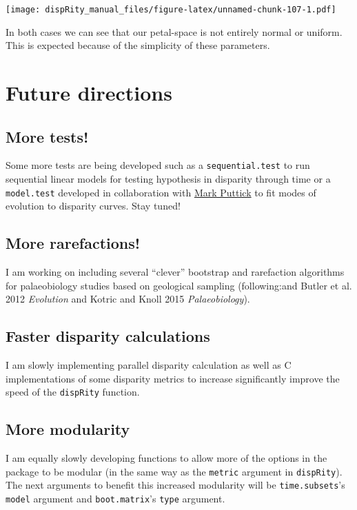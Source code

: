 \documentclass[]{book}
\theoremstyle{definition}
\theoremstyle{definition}
\theoremstyle{remark}
\begin{document}
\texttt{[image: dispRity\_manual\_files/figure-latex/unnamed-chunk-107-1.pdf]}

In both cases we can see that our petal-space is not entirely normal or
uniform. This is expected because of the simplicity of these parameters.

\chapter{Future directions}\label{future-directions}

\section{More tests!}\label{more-tests}

Some more tests are being developed such as a \texttt{sequential.test}
to run sequential linear models for testing hypothesis in disparity
through time or a \texttt{model.test} developed in collaboration with
\href{https://puttickbiology.wordpress.com/}{Mark Puttick} to fit modes
of evolution to disparity curves. Stay tuned!

\section{More rarefactions!}\label{more-rarefactions}

I am working on including several ``clever'' bootstrap and rarefaction
algorithms for palaeobiology studies based on geological sampling
(following:and Butler et al. 2012 \emph{Evolution} and Kotric and Knoll
2015 \emph{Palaeobiology}).

\section{Faster disparity
calculations}\label{faster-disparity-calculations}

I am slowly implementing parallel disparity calculation as well as C
implementations of some disparity metrics to increase significantly
improve the speed of the \texttt{dispRity} function.

\section{More modularity}\label{more-modularity}

I am equally slowly developing functions to allow more of the options in
the package to be modular (in the same way as the \texttt{metric}
argument in \texttt{dispRity}). The next arguments to benefit this
increased modularity will be \texttt{time.subsets}'s \texttt{model}
argument and \texttt{boot.matrix}'s \texttt{type} argument.
\end{document}
